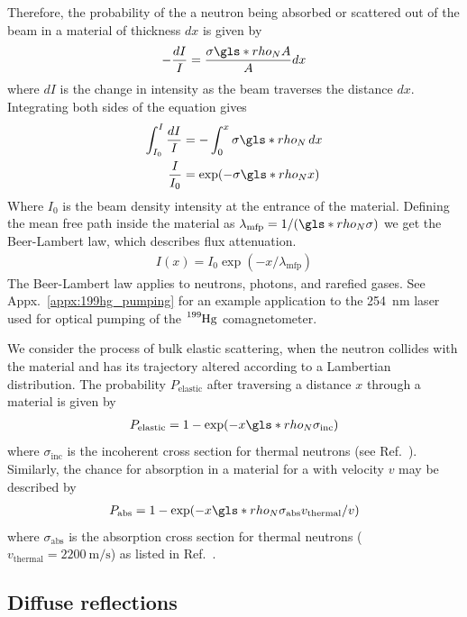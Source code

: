 Therefore, the probability of the a neutron being absorbed or scattered out of the beam in a material of thickness $dx$ is given by
%
\begin{gather}
    -\frac{dI}{I}=\frac{\sigma\gls*{rho_N} A}{A}dx
\end{gather}
%
where $dI$ is the change in intensity as the beam traverses the distance $dx$. Integrating both sides of the equation gives
%
\begin{align}
    \int^I_{I_0}\frac{dI}{I} &= -\int^x_0 \sigma \gls*{rho_N} \,dx \\
    \frac{I}{I_0} &= \exp(-\sigma \gls*{rho_N} x) \label{eq:beer_lambert_law_variant}
\end{align}
%
Where $I_0$ is the beam density intensity at the entrance of the material. Defining the mean free path inside the material as $\lambda_\text{mfp}=1/(\gls*{rho_N} \sigma)$ we get the Beer-Lambert law, which describes flux attenuation.
%
\begin{gather}
    I(x) = I_0 \exp(-x/\lambda_\text{mfp}) \label{eq:beer_lambert_law}
\end{gather}
%
 The Beer-Lambert law applies to neutrons, photons, and rarefied gases. See Appx.~\ref{appx:199hg_pumping} for an example application to the \qty{254}{\nano\meter} laser used for optical pumping of the $\ce{^199Hg}$ comagnetometer. 
 
 We consider the process of bulk elastic scattering, when the neutron collides with the material and has its trajectory altered according to a Lambertian distribution. The probability $P_\text{elastic}$ after traversing a distance $x$ through a material is given by
%
\begin{gather}
    P_\text{elastic}=1-\exp(-x \gls*{rho_N} \sigma_\text{inc})
\end{gather}
%
where $\sigma_\text{inc}$ is the incoherent cross section for thermal neutrons (see Ref.~\cite{nist_neutron_cross_sections}). Similarly, the chance for absorption in a material for a \ucn with velocity $v$ may be described by
%
\begin{gather}
    P_\text{abs}= 1-\exp(-x \gls*{rho_N} \sigma_\text{abs}v_\text{thermal}/v)
\end{gather}
%
where $\sigma_\text{abs}$ is the absorption cross section for thermal neutrons ($v_\text{thermal}=\qty{2200}{\meter\per \s}$) as listed in Ref.~\cite{nist_neutron_cross_sections}.


\subsection{Diffuse reflections}\label{sec:diffuse_reflections}

